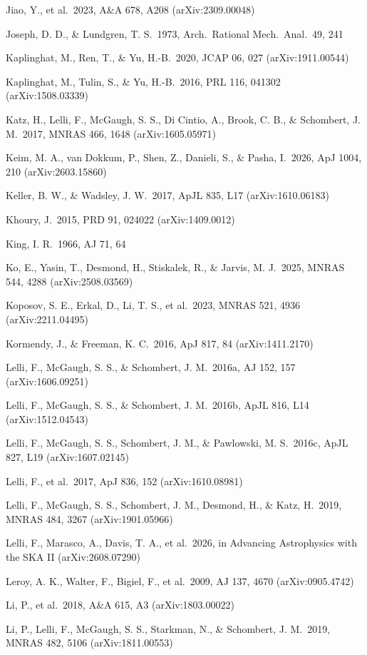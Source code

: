 \documentclass[
  10pt,
]{article}
\begin{document}
{\begin{list}{}{\setlength{\leftmargin}{1.5em}\setlength{\itemindent}{-1.5em}\setlength{\itemsep}{1pt}\setlength{\parsep}{0pt}}
\item Jiao, Y., et al.\ 2023, A\&A 678, A208 (arXiv:2309.00048)
\item Joseph, D. D., \& Lundgren, T. S.\ 1973, Arch.\ Rational Mech.\ Anal.\ 49, 241
\item Kaplinghat, M., Ren, T., \& Yu, H.-B.\ 2020, JCAP 06, 027 (arXiv:1911.00544)
\item Kaplinghat, M., Tulin, S., \& Yu, H.-B.\ 2016, PRL 116, 041302 (arXiv:1508.03339)
\item Katz, H., Lelli, F., McGaugh, S. S., Di Cintio, A., Brook, C. B., \& Schombert, J. M.\ 2017, MNRAS 466, 1648 (arXiv:1605.05971)
\item Keim, M. A., van Dokkum, P., Shen, Z., Danieli, S., \& Pasha, I.\ 2026, ApJ 1004, 210 (arXiv:2603.15860)
\item Keller, B. W., \& Wadsley, J. W.\ 2017, ApJL 835, L17 (arXiv:1610.06183)
\item Khoury, J.\ 2015, PRD 91, 024022 (arXiv:1409.0012)
\item King, I. R.\ 1966, AJ 71, 64
\item Ko, E., Yasin, T., Desmond, H., Stiskalek, R., \& Jarvis, M. J.\ 2025, MNRAS 544, 4288 (arXiv:2508.03569)
\item Koposov, S. E., Erkal, D., Li, T. S., et al.\ 2023, MNRAS 521, 4936 (arXiv:2211.04495)
\item Kormendy, J., \& Freeman, K. C.\ 2016, ApJ 817, 84 (arXiv:1411.2170)
\item Lelli, F., McGaugh, S. S., \& Schombert, J. M.\ 2016a, AJ 152, 157 (arXiv:1606.09251)
\item Lelli, F., McGaugh, S. S., \& Schombert, J. M.\ 2016b, ApJL 816, L14 (arXiv:1512.04543)
\item Lelli, F., McGaugh, S. S., Schombert, J. M., \& Pawlowski, M. S.\ 2016c, ApJL 827, L19 (arXiv:1607.02145)
\item Lelli, F., et al.\ 2017, ApJ 836, 152 (arXiv:1610.08981)
\item Lelli, F., McGaugh, S. S., Schombert, J. M., Desmond, H., \& Katz, H.\ 2019, MNRAS 484, 3267 (arXiv:1901.05966)
\item Lelli, F., Marasco, A., Davis, T. A., et al.\ 2026, in Advancing Astrophysics with the SKA II (arXiv:2608.07290)
\item Leroy, A. K., Walter, F., Bigiel, F., et al.\ 2009, AJ 137, 4670 (arXiv:0905.4742)
\item Li, P., et al.\ 2018, A\&A 615, A3 (arXiv:1803.00022)
\item Li, P., Lelli, F., McGaugh, S. S., Starkman, N., \& Schombert, J. M.\ 2019, MNRAS 482, 5106 (arXiv:1811.00553)

\end{list}}
\end{document}
